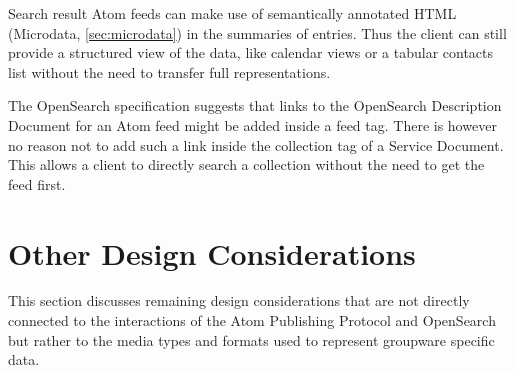 \documentclass[11pt,a4paper,headsepline,twoside]{scrartcl}		%
\begin{document}
Search result Atom feeds can make use of semantically annotated HTML (Microdata,
\autoref{sec:microdata}) in the summaries of entries. Thus the client can still
provide a structured view of the data, like calendar views or a tabular contacts
list without the need to transfer full representations.

The OpenSearch specification suggests that links to the OpenSearch Description
Document for an Atom feed might be added inside a feed tag. There is however no
reason not to add such a link inside the collection tag of a Service
Document. This allows a client to directly search a collection without the need
to get the feed first.





\section{Other Design Considerations}
\label{sec:design}

This section discusses remaining design considerations that are not directly
connected to the interactions of the Atom Publishing Protocol and OpenSearch but
rather to the media types and formats used to represent groupware specific data.



\end{document}

